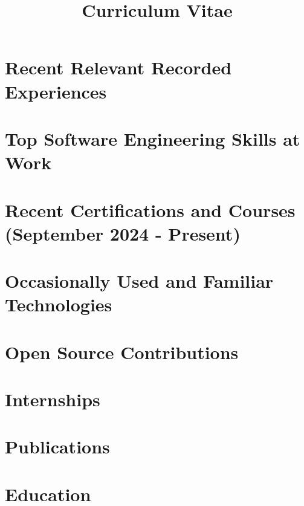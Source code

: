 \documentclass[14pt,a4paper,sans,colorlinks,urlcolor=violet, hyperindex,plainpages=false,bookmarksopen,bookmarksnumbered,pdfusetitle]{moderncv}
\title{Curriculum Vitae}
\begin{document}
\hypersetup{urlcolor=violet}

\makecvtitle
\vspace{-3em}



\vspace{-1em}

\section{Recent Relevant Recorded Experiences}


\vspace{0.5em}



\section{Top Software Engineering Skills at \textbf{Work}}


\section{Recent Certifications and Courses (September 2024 - Present)}


\section{Occasionally Used and Familiar Technologies}


\section{Open Source Contributions}


\section{Internships}


\section{Publications}


\section{Education}


\vspace{0.5em}


\end{document}
